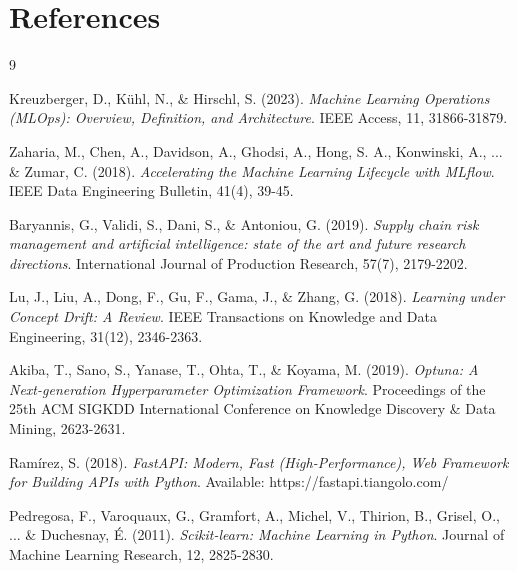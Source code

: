 \documentclass[11pt,a4paper]{article}
\begin{document}
\section*{References}

\begin{thebibliography}{9}

Kreuzberger, D., Kühl, N., \& Hirschl, S. (2023).
\textit{Machine Learning Operations (MLOps): Overview, Definition, and Architecture}.
IEEE Access, 11, 31866-31879.

Zaharia, M., Chen, A., Davidson, A., Ghodsi, A., Hong, S. A., Konwinski, A., ... \& Zumar, C. (2018).
\textit{Accelerating the Machine Learning Lifecycle with MLflow}.
IEEE Data Engineering Bulletin, 41(4), 39-45.

Baryannis, G., Validi, S., Dani, S., \& Antoniou, G. (2019).
\textit{Supply chain risk management and artificial intelligence: state of the art and future research directions}.
International Journal of Production Research, 57(7), 2179-2202.

Lu, J., Liu, A., Dong, F., Gu, F., Gama, J., \& Zhang, G. (2018).
\textit{Learning under Concept Drift: A Review}.
IEEE Transactions on Knowledge and Data Engineering, 31(12), 2346-2363.

Akiba, T., Sano, S., Yanase, T., Ohta, T., \& Koyama, M. (2019).
\textit{Optuna: A Next-generation Hyperparameter Optimization Framework}.
Proceedings of the 25th ACM SIGKDD International Conference on Knowledge Discovery \& Data Mining, 2623-2631.

Ramírez, S. (2018).
\textit{FastAPI: Modern, Fast (High-Performance), Web Framework for Building APIs with Python}.
Available: https://fastapi.tiangolo.com/

Pedregosa, F., Varoquaux, G., Gramfort, A., Michel, V., Thirion, B., Grisel, O., ... \& Duchesnay, É. (2011).
\textit{Scikit-learn: Machine Learning in Python}.
Journal of Machine Learning Research, 12, 2825-2830.

\end{thebibliography}
\end{document}
